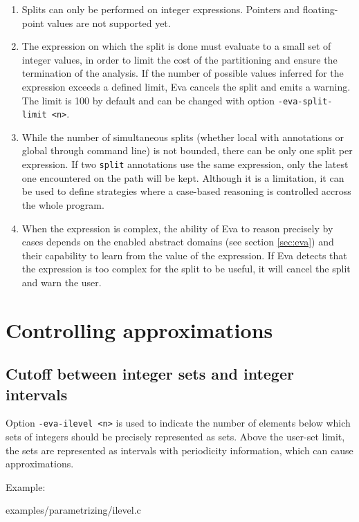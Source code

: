 \documentclass[web]{frama-c-book}
\newcommand{\Eva}{\textsf{Eva}}
\begin{document}
\begin{enumerate}
\item Splits can only be performed on integer expressions. Pointers and
  floating-point values are not supported yet.
\item The expression on which the split is done must evaluate to a small set of
  integer values, in order to limit the cost of the partitioning and ensure the
  termination of the analysis. If the number of possible values inferred for the
  expression exceeds a defined limit, \Eva{} cancels the split and emits a
  warning. The limit is 100 by default and can be changed with option
  \lstinline|-eva-split-limit <n>|.
\item While the number of simultaneous splits (whether local with annotations
  or global through command line) is not bounded, there can be only one split
  per expression. If two \lstinline|split| annotations use the same expression,
  only the latest one encountered on the path will be kept. Although it is a
  limitation, it can be used to define strategies where a case-based reasoning
  is controlled accross the whole program.
\item When the expression is complex, the ability of \Eva{} to reason
  precisely by cases depends on the enabled abstract domains (see section
  \ref{sec:eva}) and their capability to learn from the value of the expression.
  If \Eva{} detects that the expression is too complex for the split to be useful,
  it will cancel the split and warn the user.
\end{enumerate}


\section{Controlling approximations}
\label{controlling-approximations}

\subsection{Cutoff between integer sets and integer intervals}

Option \verb|-eva-ilevel <n>| is used to indicate the number of elements
below which sets of integers should be precisely represented as sets.
Above the user-set limit, the sets are represented as intervals
with periodicity information, which can cause approximations.

Example:

  {examples/parametrizing/ilevel.c}
\end{document}
